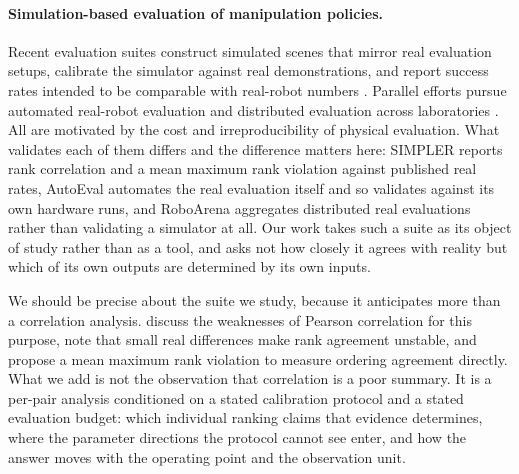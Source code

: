 \documentclass[pdflatex,iicol,sn-apa]{sn-jnl}
\theoremstyle{remark}
\begin{document}
\paragraph{Simulation-based evaluation of manipulation policies.}
Recent evaluation suites construct simulated scenes that mirror real evaluation setups, calibrate
the simulator against real demonstrations, and report success rates intended to be comparable with
real-robot numbers \citep{li2024simpler}. Parallel efforts pursue automated real-robot evaluation
\citep{zhou2025autoeval} and distributed evaluation across laboratories
\citep{atreya2025roboarena}. All are motivated by the cost and irreproducibility of physical
evaluation. What validates each of them differs and the difference matters here: SIMPLER reports
rank correlation and a mean maximum rank violation against published real rates, AutoEval automates
the real evaluation itself and so validates against its own hardware runs, and RoboArena aggregates
distributed real evaluations rather than validating a simulator at all. Our work takes such a suite as its
object of study rather than as a tool, and asks not how closely it agrees with reality but which of
its own outputs are determined by its own inputs.

We should be precise about the suite we study, because it anticipates more than a correlation
analysis. \citet{li2024simpler} discuss the weaknesses of Pearson correlation for this purpose,
note that small real differences make rank agreement unstable, and propose a mean maximum rank
violation to measure ordering agreement directly. What we add is not the observation that
correlation is a poor summary. It is a per-pair analysis conditioned on a stated calibration
protocol and a stated evaluation budget: which individual ranking claims that evidence determines,
where the parameter directions the protocol cannot see enter, and how the answer moves with the
operating point and the observation unit.
\end{document}
